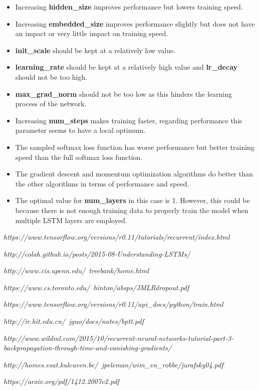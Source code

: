 \documentclass[10pt,a4paper,titlepage]{article}
\begin{document}
\begin{itemize}
	\item Increasing \textbf{hidden\_size} improves performance but lowers training speed.
	\item Increasing \textbf{embedded\_size} improves performance slightly but does not have an impact or very little impact on training speed.
	\item \textbf{init\_scale} should be kept at a relatively low value.	
	\item \textbf{learning\_rate} should be kept at a relatively high value and \textbf{lr\_decay} should not be too high.
	\item \textbf{max\_grad\_norm} should not be too low as this hinders the learning process of the network.
	\item Increasing \textbf{num\_steps} makes training faster, regarding performance this parameter seems to have a local optimum. 
	\item The sampled softmax loss function has worse performance but better training speed than the full softmax loss function. 
	\item The gradient descent and momentum optimization algorithms do better than the other algorithms in terms of performance and speed.
	\item The optimal value for \textbf{num\_layers} in this case is 1. However, this could be because there is not enough training data to properly train the model when multiple LSTM layers are employed.
\end{itemize}


\newpage
{}
\begin{thebibliography}{9}
	
	\textit{https://www.tensorflow.org/versions/r0.11/tutorials/recurrent/index.html}
	
	\textit{http://colah.github.io/posts/2015-08-Understanding-LSTMs/}
	
	\textit{http://www.cis.upenn.edu/~treebank/home.html}
	
	\textit{https://www.cs.toronto.edu/~hinton/absps/JMLRdropout.pdf}
	
	\textit{https://www.tensorflow.org/versions/r0.11/api\_docs/python/train.html}
	
	\textit{http://ir.hit.edu.cn/~jguo/docs/notes/bptt.pdf}
	
	\textit{http://www.wildml.com/2015/10/recurrent-neural-networks-tutorial-part-3-backpropagation-through-time-and-vanishing-gradients/}
	
	\textit{http://homes.esat.kuleuven.be/~jpeleman/wim\_en\_robbe/jurafsky04.pdf}
	
	\textit{https://arxiv.org/pdf/1412.2007v2.pdf}
	
\end{thebibliography}
	
\end{document}
